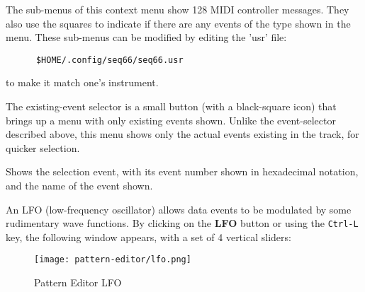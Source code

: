    The sub-menus of this context menu show 128 MIDI controller messages.
   They also use the squares to
   indicate if there are any events of the type shown in the menu.
   These sub-menus can be modified by editing the 'usr' file:
   
   \begin{verbatim}
      $HOME/.config/seq66/seq66.usr
   \end{verbatim}

   to make it match one's instrument.

   The existing-event selector is a small button (with a black-square icon)
   that brings up a menu with only existing events shown.
   Unlike the event-selector described above, this menu
   shows only the actual events existing in the track, for quicker selection.

   Shows the selection event, with its event number shown in hexadecimal
   notation, and the name of the event shown.

   An LFO (low-frequency oscillator) allows data events
   to be modulated by some rudimentary wave functions.
   By clicking on the \textbf{LFO} button or using the \texttt{Ctrl-L} key,
   the following window appears, with a set of 4 vertical sliders:

\begin{figure}[H]
   \centering 
  \texttt{[image: pattern-editor/lfo.png]}
   \caption{Pattern Editor LFO}
   \label{fig:pattern_editor_bottom_lfo}
\end{figure}


